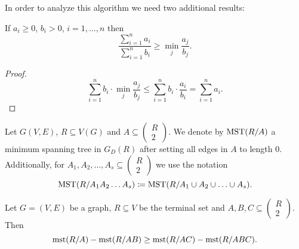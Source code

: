 \documentclass[../skript.tex]{subfiles}
\begin{document}
\vspace{-7pt}
\EndAlgorithmLine
In order to analyze this algorithm we need two additional results:
\begin{proposition} %
\label{thm:75}
If $a_i \geq 0$, $b_i > 0$, $i = 1, \ldots, n$ then
\[
	\frac{\sum_{i=1}^n a_i}{\sum_{i=1}^n b_i} \geq \min_j \frac{a_j}{b_j}.
\]
\end{proposition}
\begin{proof}
\[
	\sum_{i=1}^n b_i \cdot \min_j \frac{a_j}{b_j} \leq \sum_{i=1}^n b_i \cdot \frac{a_i}{b_i} = \sum_{i=1}^n a_i.
\]
\end{proof}
Let $G(V, E)$, $R \subseteq V(G)$ and $A \subseteq \begin{pmatrix}
R \\ 2
\end{pmatrix}$.
We denote by $\operatorname{MST}(R/A)$ a minimum spanning tree in $G_D(R)$ after setting all edges in $A$ to length 0. Additionally, for $A_1, A_2, \ldots, A_s \subseteq \begin{pmatrix}
R \\ 2
\end{pmatrix}$ we use the notation
\[
	\operatorname{MST}(R/A_1 A_2 \ldots A_s) \coloneqq \operatorname{MST}(R / A_1 \cup A_2 \cup \ldots \cup A_s).
\]
\begin{lemma} %
\label{thm:76}
Let $G = (V, E)$ be a graph, $R \subseteq V$ be the terminal set and $A, B, C \subseteq \begin{pmatrix}
R \\ 2
\end{pmatrix}$. Then
\[
	\operatorname{mst}(R/A) - \operatorname{mst}(R/AB) \geq \operatorname{mst}(R/AC) - \operatorname{mst}(R/ABC).
\]
\end{lemma}
\end{document}
